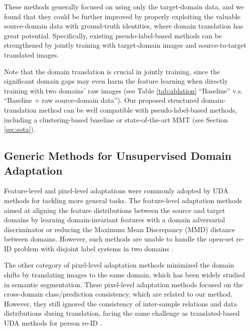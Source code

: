 \documentclass[journal]{IEEEtran}
\begin{document}
These methods generally focused on using only the target-domain data, and we found that they could be further improved by properly exploiting the valuable source-domain data with ground-truth identities, where domain translation has great potential.
Specifically, existing pseudo-label-based methods can be strengthened by jointly training with target-domain images and source-to-target translated images.

Note that the domain translation is crucial in jointly training, since the significant domain gaps may even harm the feature learning when directly training with two domains' raw images (see Table \ref{tab:ablation} ``Baseline'' v.s. ``Baseline + raw source-domain data'').
Our proposed structured domain-translation method can be well compatible with pseudo-label-based methods, including a clustering-based baseline \cite{song2018unsupervised} or state-of-the-art MMT \cite{ge2020mutual} (see Section \ref{sec:sota}).

\subsection{Generic Methods for Unsupervised Domain Adaptation}

Feature-level and pixel-level adaptations were commonly adopted by UDA methods for tackling more general tasks.
The feature-level adaptation methods \cite{long2015learning,sun2016deep,tzeng2017adversarial,das2018unsupervised,9057713,9115868} aimed at aligning the feature distributions between the source and target domains by learning domain-invariant features with a domain adversarial discriminator \cite{bousmalis2016domain,tzeng2017adversarial} or reducing the Maximum Mean Discrepancy (MMD) \cite{gretton2007kernel} distance between domains.
However,
such methods are unable to handle the open-set re-ID problem with disjoint label systems in two domains \cite{zhong2019invariance,panareda2017open,saito2018open}.

The other category of pixel-level adaptation methods \cite{hoffman2017cycada,li2019bidirectional,chen2019crdoco} minimized the domain shifts by translating images to the same domain,
which has been widely studied in semantic segmentation.
These pixel-level adaptation methods focused on the cross-domain class/prediction consistency, which are related to our method. However,
they still ignored the consistency of inter-sample relations and data distributions during translation, facing the same challenge as translated-based UDA methods for person re-ID \cite{deng2018image,wei2018person,deng2018similarity,chen2019instance}.
\end{document}

